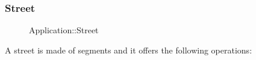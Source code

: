 \subsubsection{Street}
\begin{figure}[h]
\centering
{}
\caption{Application::Street}
\end{figure}
\FloatBarrier
A street is made of segments and it offers the following operations:
